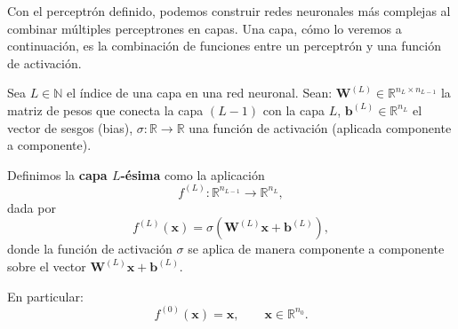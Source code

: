 \newpage

Con el perceptrón definido, podemos construir redes neuronales más complejas al combinar múltiples perceptrones en capas.
Una capa, cómo lo veremos a continuación, es la combinación de funciones entre un perceptrón y una función de activación.

\begin{definition}
    Sea $L \in \mathbb{N}$ el índice de una capa en una red neuronal.
    Sean:
    $\mathbf{W}^{(L)} \in \mathbb{R}^{n_L \times n_{L-1}}$ la matriz de pesos que conecta la capa $(L-1)$ con la capa $L$, $\mathbf{b}^{(L)} \in \mathbb{R}^{n_L}$ el vector de sesgos (bias), $\sigma : \mathbb{R} \to \mathbb{R}$ una función de activación (aplicada componente a componente).

    Definimos la \textbf{capa $L$-ésima} como la aplicación
    \[
        f^{(L)} : \mathbb{R}^{n_{L-1}} \longrightarrow \mathbb{R}^{n_L},
    \]
    dada por
    \[
        f^{(L)}(\mathbf{x}) = \sigma\!\left(\mathbf{W}^{(L)} \mathbf{x} + \mathbf{b}^{(L)}\right),
    \]
    donde la función de activación $\sigma$ se aplica de manera componente a componente sobre el vector $\mathbf{W}^{(L)} \mathbf{x} + \mathbf{b}^{(L)}$.

    En particular:
    \[
        f^{(0)}(\mathbf{x}) = \mathbf{x}, \qquad \mathbf{x} \in \mathbb{R}^{n_0}.
    \]
\end{definition}

